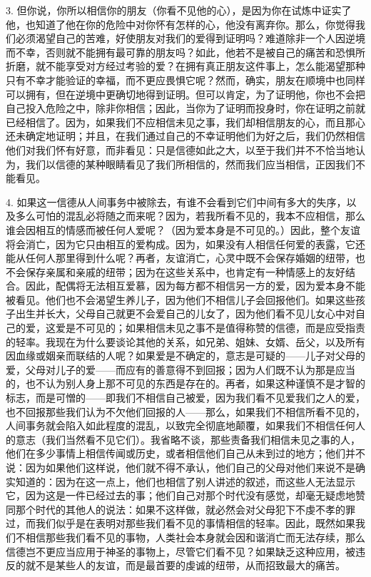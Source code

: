3. 但你说，你所以相信你的朋友（你看不见他的心），是因为你在试炼中证实了他，也知道了他在你的危险中对你怀有怎样的心，他没有离弃你。那么，你觉得我们必须渴望自己的苦难，好使朋友对我们的爱得到证明吗？难道除非一个人因逆境而不幸，否则就不能拥有最可靠的朋友吗？如此，他若不是被自己的痛苦和恐惧所折磨，就不能享受对方经过考验的爱？在拥有真正朋友这件事上，怎么能渴望那种只有不幸才能验证的幸福，而不更应畏惧它呢？然而，确实，朋友在顺境中也同样可以拥有，但在逆境中更确切地得到证明。但可以肯定，为了证明他，你也不会把自己投入危险之中，除非你相信；因此，当你为了证明而投身时，你在证明之前就已经相信了。因为，如果我们不应相信未见之事，我们却相信朋友的心，而且那心还未确定地证明；并且，在我们通过自己的不幸证明他们为好之后，我们仍然相信他们对我们怀有好意，而非看见：只是信德如此之大，以至于我们并不不恰当地认为，我们以信德的某种眼睛看见了我们所相信的，然而我们应当相信，正因我们不能看见。\par

4. 如果这一信德从人间事务中被除去，有谁不会看到它们中间有多大的失序，以及多么可怕的混乱必将随之而来呢？因为，若我所看不见的，我本不应相信，那么谁会因相互的情感而被任何人爱呢？（因为爱本身是不可见的。）因此，整个友谊将会消亡，因为它只由相互的爱构成。因为，如果没有人相信任何爱的表露，它还能从任何人那里得到什么呢？再者，友谊消亡，心灵中既不会保存婚姻的纽带，也不会保存亲属和亲戚的纽带；因为在这些关系中，也肯定有一种情感上的友好结合。因此，配偶将无法相互爱慕，因为每方都不相信另一方的爱，因为爱本身不能被看见。他们也不会渴望生养儿子，因为他们不相信儿子会回报他们。如果这些孩子出生并长大，父母自己就更不会爱自己的儿女了，因为他们看不见儿女心中对自己的爱，这爱是不可见的；如果相信未见之事不是值得称赞的信德，而是应受指责的轻率。我现在为什么要谈论其他的关系，如兄弟、姐妹、女婿、岳父，以及所有因血缘或姻亲而联结的人呢？如果爱是不确定的，意志是可疑的——儿子对父母的爱，父母对儿子的爱——而应有的善意得不到回报；因为人们既不认为那是应当的，也不认为别人身上那不可见的东西是存在的。再者，如果这种谨慎不是才智的标志，而是可憎的——即我们不相信自己被爱，因为我们看不见爱我们之人的爱，也不回报那些我们认为不欠他们回报的人——那么，如果我们不相信所看不见的，人间事务就会陷入如此程度的混乱，以致完全彻底地颠覆，如果我们不相信任何人的意志（我们当然看不见它们）。我省略不谈，那些责备我们相信未见之事的人，他们在多少事情上相信传闻或历史，或者相信他们自己从未到过的地方；他们并不说：因为如果他们这样说，他们就不得不承认，他们自己的父母对他们来说不是确实知道的：因为在这一点上，他们也相信了别人讲述的叙述，而这些人无法显示它，因为这是一件已经过去的事；他们自己对那个时代没有感觉，却毫无疑虑地赞同那个时代的其他人的说法：如果不这样做，就必然会对父母犯下不虔不孝的罪过，而我们似乎是在表明对那些我们看不见的事情相信的轻率。因此，既然如果我们不相信那些我们看不见的事物，人类社会本身就会因和谐消亡而无法存续，那么信德岂不更应当应用于神圣的事物上，尽管它们看不见？如果缺乏这种应用，被违反的就不是某些人的友谊，而是最首要的虔诚的纽带，从而招致最大的痛苦。\par

